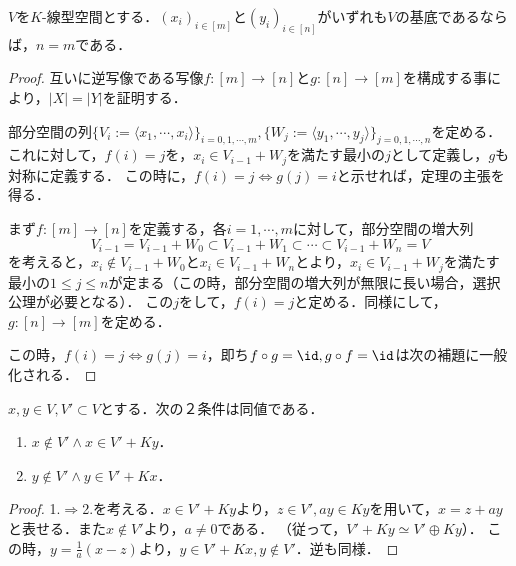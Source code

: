 \documentclass[uplatex, dvipdfmx]{jsreport}
\begin{document}
\begin{shadebox}\begin{theorem}\label{thm-dimention}
    $V$を$K$-線型空間とする．$(x_i)_{i\in [m]}$と$(y_i)_{i\in [n]}$がいずれも$V$の基底であるならば，$n=m$である．
\end{theorem}\end{shadebox}
\begin{proof}
    互いに逆写像である写像$f:[m]\to[n]$と$g:[n]\to[m]$を構成する事により，$|X|=|Y|$を証明する．

    部分空間の列$\{V_i:=\langle x_1,\cdots,x_i\rangle\}_{i=0,1,\cdots,m},\{W_j:=\langle y_1,\cdots,y_j\rangle\}_{j=0,1,\cdots,n}$を定める．
    これに対して，$f(i)=j$を，$x_i\in V_{i-1}+W_j$を満たす最小の$j$として定義し，$g$も対称に定義する．
    この時に，$f(i)=j\Leftrightarrow g(j)=i$と示せれば，定理の主張を得る．

    まず$f:[m]\to[n]$を定義する，各$i=1,\cdots,m$に対して，部分空間の増大列
    \[ V_{i-1}=V_{i-1}+W_0\subset V_{i-1}+W_1\subset\cdots\subset V_{i-1}+W_n=V \]
    を考えると，$x_i\notin V_{i-1}+W_0$と$x_i\in V_{i-1}+W_n$とより，$x_i\in V_{i-1}+W_j$を満たす最小の$1\le j\le n$が定まる（この時，部分空間の増大列が無限に長い場合，選択公理が必要となる）．
    この$j$をして，$f(i)=j$と定める．同様にして，$g:[n]\to[m]$を定める．

    この時，$f(i)=j\Leftrightarrow g(j)=i$，即ち$f\circ g=\id,g\circ f=\id$は次の補題に一般化される．
\end{proof}
\begin{lemma}\label{lemma-welldefinedness-of-expansion-of-subspaces}
    $x,y\in V, V'\subset V$とする．次の２条件は同値である．
    \begin{enumerate}
        \item $x\notin V'\land x\in V'+Ky$．
        \item $y\notin V'\land y\in V'+Kx$．
    \end{enumerate}
\end{lemma}
\begin{proof}
    1.$\Rightarrow$2.を考える．$x\in V'+Ky$より，$z\in V', ay\in Ky$を用いて，$x=z+ay$と表せる．また$x\notin V'$より，$a\ne 0$である．
    （従って，$V'+Ky\simeq V'\oplus Ky$）．
    この時，$y=\frac{1}{a}(x-z)$より，$y\in V'+Kx, y\notin V'$．逆も同様．
\end{proof}
\end{document}

